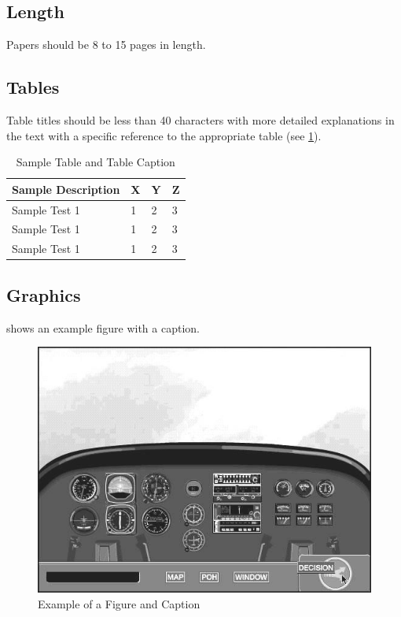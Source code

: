 \documentclass{dasc}
\begin{document}
\subsection*{Length}

Papers should be 8 to 15 pages in length.

\subsection*{Tables}

Table titles should be less than 40 characters with more detailed explanations in the text with a specific reference to the appropriate table (see \cref{tab:example table}).

\begin{table}
\centering
\caption{Sample Table and Table Caption \label{tab:example table}}
\begin{tabular}{llll}
	\toprule
	Sample Description & X & Y & Z \\ \midrule
	Sample Test 1 & 1 & 2 & 3 \\
	Sample Test 1 & 1 & 2 & 3 \\
	Sample Test 1 & 1 & 2 & 3 \\
	\bottomrule	
\end{tabular}
\end{table}

\subsection*{Graphics}

 shows an example figure with a caption.

\begin{figure}
\centering
\includegraphics[width=\columnwidth]{figure.jpg}
\caption{Example of a Figure and Caption \label{fig:example figure}}
\end{figure}
\end{document}

